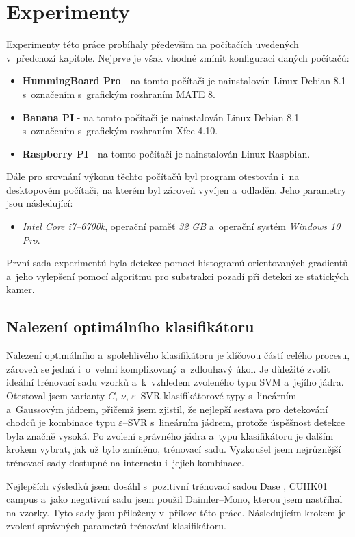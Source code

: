 \section{Experimenty}

Experimenty této práce probíhaly především na počítačích uvedených v~předchozí kapitole. Nejprve je však vhodné zmínit konfiguraci daných počítačů:
\begin{itemize}
\item\textbf{HummingBoard Pro} - na tomto počítači je nainstalován Linux Debian 8.1 s~označením  s~grafickým rozhraním MATE 8.
\item\textbf{Banana PI} - na tomto počítači je nainstalován Linux Debian 8.1 s~označením  s~grafickým rozhraním Xfce 4.10. 
\item\textbf{Raspberry PI} - na tomto počítači je nainstalován Linux Raspbian. 
\end{itemize}
Dále pro srovnání výkonu těchto počítačů byl program otestován i~na desktopovém počítači, na kterém byl zároveň vyvíjen a~odladěn. Jeho parametry jsou následující: 
\begin{itemize}
\item\textit{Intel Core i7--6700k}, operační paměť  \textit{32 GB} a~operační systém  \textit{Windows 10 Pro}.
\end{itemize}
První sada experimentů byla detekce pomocí histogramů orientovaných gradientů a~jeho vylepšení pomocí algoritmu pro substrakci pozadí při detekci ze statických kamer.

\subsection{Nalezení optimálního klasifikátoru}

Nalezení optimálního a~spolehlivého klasifikátoru je klíčovou částí celého procesu, zároveň se jedná i~o~velmi komplikovaný a~zdlouhavý úkol. Je důležité zvolit ideální trénovací sadu vzorků a~k~vzhledem zvoleného typu SVM a~jejího jádra. Otestoval jsem varianty $C$, $\nu$, $\varepsilon$--SVR klasifikátorové typy s~lineárním a~Gaussovým jádrem, přičemž jsem zjistil, že nejlepší sestava pro detekování chodců je kombinace 
typu $\varepsilon$--SVR s~lineárním jádrem, protože úspěšnost detekce byla značně vysoká. Po zvolení správného jádra a~typu klasifikátoru je dalším krokem vybrat, jak už bylo zmíněno, trénovací sadu. Vyzkoušel jsem nejrůznější trénovací sady dostupné na internetu i~jejich kombinace.

Nejlepších výsledků jsem dosáhl s~pozitivní trénovací sadou Dase \cite{sudipdas}, CUHK01 campus \cite{cuhk} a~jako negativní sadu jsem použil Daimler--Mono\cite{daimler}, kterou jsem nastříhal na vzorky. Tyto sady jsou přiloženy v~příloze této práce. Následujícím krokem je zvolení správných parametrů trénování klasifikátoru. 


